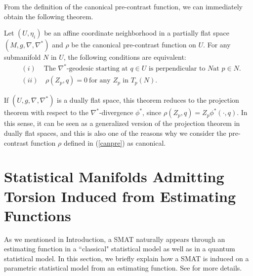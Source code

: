 \documentclass[graybox]{svmult}
\begin{document}
From the definition of the canonical pre-contrast function, we can immediately obtain
the following theorem.
%
\begin{corollary}
   Let $(U,\eta_i)$ be an affine coordinate neighborhood in a partially flat space 
   $(M,g,\nabla,\nabla^{\ast})$ and $\rho$ be the canonical pre-contrast function 
   on $U$. For any submanifold $N$ in $U$, the following
   conditions are equivalent:
%
\begin{eqnarray*}
   &(i)& \mbox{The $\nabla^{\ast}$-geodesic starting at $q \in U$ is perpendicular to $N$
               at $p \in N$}. \\
   &(ii)& \ \rho(Z_p, q) = 0 \ \mbox{for any $Z_p$ in $T_p(N)$.} \label{gpthm}
\end{eqnarray*}
\end{corollary}
%
If $(U,g,\nabla,\nabla^{\ast})$ is a dually flat space, this theorem reduces to the
projection theorem with respect to the $\nabla^{\ast}$-divergence $\phi^{\ast}$, since
$\rho(Z_p, q)=Z_p\phi^{\ast}(\cdot,q)$.
In this sense, it can be seen as a generalized version of the projection theorem in
dually flat spaces, and this is also one of the reasons why we consider the pre-contrast
function $\rho$ defined in (\ref{canpre}) as canonical.

\section{Statistical Manifolds Admitting Torsion Induced from Estimating Functions}
\label{sec:5}
As we mentioned in Introduction, a SMAT naturally appears through an estimating function in
a ``classical" statistical model as well as in a quantum statistical model. In this section,
we briefly explain how a SMAT is induced on a parametric statistical model from an estimating
function. See \cite{HM} for more details.
\end{document}
